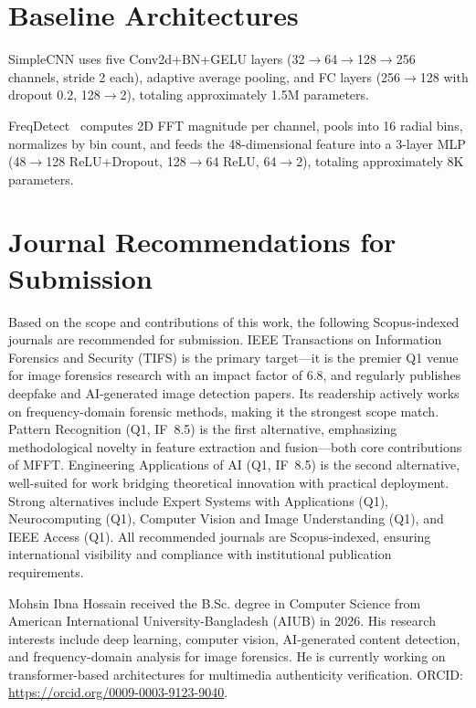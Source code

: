 \documentclass[journal]{IEEEtran}
\begin{document}
\section{Baseline Architectures}
\label{app:baselines}
SimpleCNN uses five Conv2d+BN+GELU layers (32$\rightarrow$64$\rightarrow$128$\rightarrow$256 channels, stride 2 each), adaptive average pooling, and FC layers (256$\rightarrow$128 with dropout 0.2, 128$\rightarrow$2), totaling approximately 1.5M parameters.

FreqDetect~\cite{frank2020} computes 2D FFT magnitude per channel, pools into 16 radial bins, normalizes by bin count, and feeds the 48-dimensional feature into a 3-layer MLP (48$\rightarrow$128 ReLU+Dropout, 128$\rightarrow$64 ReLU, 64$\rightarrow$2), totaling approximately 8K parameters.

\section{Journal Recommendations for Submission}
\label{app:journals}
Based on the scope and contributions of this work, the following Scopus-indexed journals are recommended for submission. IEEE Transactions on Information Forensics and Security (TIFS) is the primary target---it is the premier Q1 venue for image forensics research with an impact factor of 6.8, and regularly publishes deepfake and AI-generated image detection papers. Its readership actively works on frequency-domain forensic methods, making it the strongest scope match. Pattern Recognition (Q1, IF~8.5) is the first alternative, emphasizing methodological novelty in feature extraction and fusion---both core contributions of MFFT. Engineering Applications of AI (Q1, IF~8.5) is the second alternative, well-suited for work bridging theoretical innovation with practical deployment. Strong alternatives include Expert Systems with Applications (Q1), Neurocomputing (Q1), Computer Vision and Image Understanding (Q1), and IEEE Access (Q1). All recommended journals are Scopus-indexed, ensuring international visibility and compliance with institutional publication requirements.

\begin{IEEEbiography}{Mohsin Ibna Hossain}
received the B.Sc. degree in Computer Science from American International University-Bangladesh (AIUB) in 2026. His research interests include deep learning, computer vision, AI-generated content detection, and frequency-domain analysis for image forensics. He is currently working on transformer-based architectures for multimedia authenticity verification. ORCID: \url{https://orcid.org/0009-0003-9123-9040}.
\end{IEEEbiography}
\end{document}
